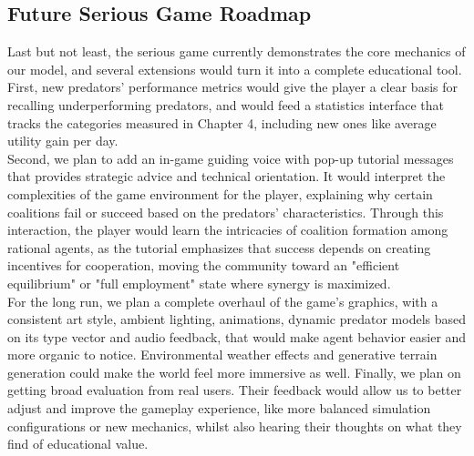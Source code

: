 \documentclass[12pt,a4paper]{report}
\begin{document}
	\subsection{Future Serious Game Roadmap}

	Last but not least, the serious game currently demonstrates the core mechanics of our model, and several extensions would turn it into a complete educational tool. First, new predators' performance metrics would give the player a clear basis for recalling underperforming predators, and would feed a statistics interface that tracks the categories measured in Chapter 4, including new ones like average utility gain per day. \\
    
    Second, we plan to add an in-game guiding voice with pop-up tutorial messages that provides strategic advice and technical orientation. It would interpret the complexities of the game environment for the player, explaining why certain coalitions fail or succeed based on the predators' characteristics. Through this interaction, the player would learn the intricacies of coalition formation among rational agents, as the tutorial emphasizes that success depends on creating incentives for cooperation, moving the community toward an "efficient equilibrium" or "full employment" state where synergy is maximized. \\

    For the long run, we plan a complete overhaul of the game’s graphics, with a consistent art style, ambient lighting, animations, dynamic predator models based on its type vector and audio feedback, that would make agent behavior easier and more organic to notice. Environmental weather effects and generative terrain generation could make the world feel more immersive as well. Finally, we plan on getting broad evaluation from real users. Their feedback would allow us to better adjust and improve the gameplay experience, like more balanced simulation configurations or new mechanics, whilst also hearing their thoughts on what they find of educational value. \\ \\ \\
\end{document}
